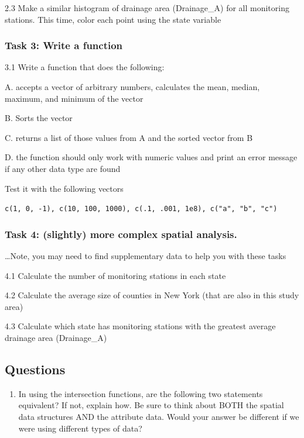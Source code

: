 \documentclass[]{article}
\providecommand{\tightlist}{%
  \setlength{\itemsep}{0pt}\setlength{\parskip}{0pt}}
\begin{document}
2.3 Make a similar histogram of drainage area (Drainage\_A) for all
monitoring stations. This time, color each point using the state
variable

\hypertarget{task-3-write-a-function}{%
\subsubsection{Task 3: Write a function}\label{task-3-write-a-function}}

3.1 Write a function that does the following:

A. accepts a vector of arbitrary numbers, calculates the mean, median,
maximum, and minimum of the vector

B. Sorts the vector

C. returns a list of those values from A and the sorted vector from B

D. the function should only work with numeric values and print an error
message if any other data type are found

Test it with the following vectors

\texttt{c(1,\ 0,\ -1),\ c(10,\ 100,\ 1000),\ c(.1,\ .001,\ 1e8),\ c("a",\ "b",\ "c")}

\hypertarget{task-4-slightly-more-complex-spatial-analysis.}{%
\subsubsection{Task 4: (slightly) more complex spatial
analysis.}\label{task-4-slightly-more-complex-spatial-analysis.}}

\ldots Note, you may need to find supplementary data to help you with
these tasks

4.1 Calculate the number of monitoring stations in each state

4.2 Calculate the average size of counties in New York (that are also in
this study area)

4.3 Calculate which state has monitoring stations with the greatest
average drainage area (Drainage\_A)

\hypertarget{questions}{%
\subsection{Questions}\label{questions}}

\begin{enumerate}
\def\labelenumi{\arabic{enumi}.}
\tightlist
\item
  In using the intersection functions, are the following two statements
  equivalent? If not, explain how. Be sure to think about BOTH the
  spatial data structures AND the attribute data. Would your answer be
  different if we were using different types of data?
\end{enumerate}
\end{document}
